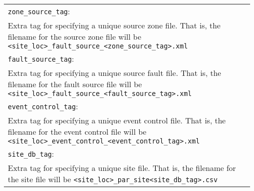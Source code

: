 \vspace{2em}
\begin{tabular}{|p{\textwidth}|}
\hline \vspace{0.1em} \texttt{zone\_source\_tag}: \\
Extra tag for specifying a unique source zone file. That is, the
filename for the source zone file will be
\texttt{<site\_loc>\_}\texttt{fault\_source\_}\texttt{<zone\_source\_tag>}\texttt{.xml}
\\
\hline \vspace{0.1em} \texttt{fault\_source\_tag}: \\
Extra tag for specifying a unique source fault file. That is, the
filename for the fault source file will be
\texttt{<site\_loc>\_}\texttt{fault\_source\_}\texttt{<fault\_source\_tag>}\texttt{.xml}
\\
\hline \vspace{0.1em} \texttt{event\_control\_tag}: \\
Extra tag for specifying a unique event control file. That is, the
filename for the event control file will be
\texttt{<site\_loc>\_}\texttt{event\_control\_}\texttt{<event\_control\_tag>}\texttt{.xml}
\\
\hline \vspace{0.1em} \texttt{site\_db\_tag}: \\
Extra tag for specifying a unique site file. That is, the filename
for the site file will be
\texttt{<site\_loc>\_}\texttt{par\_site}\texttt{<site\_db\_tag>}\texttt{.csv}
\\
\hline
 \end{tabular}

